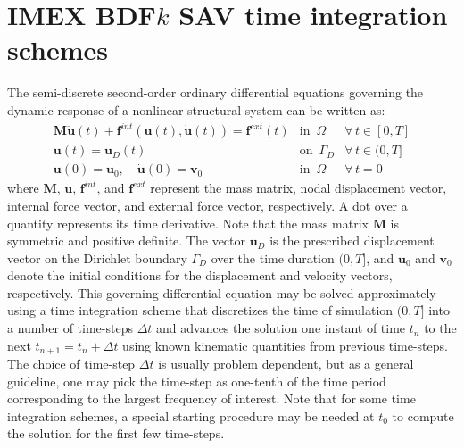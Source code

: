 \documentclass[review]{elsarticle}
\begin{document}
\section{IMEX BDF$k$ SAV time integration schemes}
\label{sec:4th2}
The semi-discrete second-order ordinary differential equations governing the dynamic response of a nonlinear structural system can be written as:
\begin{equation}
    \begin{array}{lll}
        \boldsymbol{M}\ddot{\boldsymbol{u}}(t)+\boldsymbol{f}^{int}(\boldsymbol{u}(t),\dot{\boldsymbol{u}}(t))=\boldsymbol{f}^{ext}(t) & \textrm{in  } \, \Omega & \forall \, t \in [0,T] \\
        \boldsymbol{u}(t) = \boldsymbol{u}_D(t) & \textrm{on  } \, \Gamma_D & \forall \, t \in (0,T] \\
        \boldsymbol{u}(0) = \boldsymbol{u}_0, \quad \dot{\boldsymbol{u}}(0) = \boldsymbol{v}_0 & \textrm{in  } \, \Omega & \forall \, t = 0
    \end{array}
    \label{eqn:4thGDE}
\end{equation}
where $\boldsymbol{M}$, $\boldsymbol{u}$, $\boldsymbol{f}^{int}$, and $\boldsymbol{f}^{ext}$ represent the mass matrix, nodal displacement vector, internal force vector, and external force vector, respectively.
A dot over a quantity represents its time derivative.
Note that the mass matrix $\boldsymbol{M}$ is symmetric and positive definite.
The vector $\boldsymbol{u}_D$ is the prescribed displacement vector on the Dirichlet boundary $\Gamma_D$ over the time duration $(0,T]$, and $\boldsymbol{u}_0$ and $\boldsymbol{v}_0$ denote the initial conditions for the displacement and velocity vectors, respectively.
This governing differential equation may be solved approximately using a time integration scheme that discretizes the time of simulation $(0, T]$ into a number of time-steps $\Delta t$ and advances the solution one instant of time $t_n$ to the next $t_{n+1} = t_n + \Delta t$ using known kinematic quantities from previous time-steps.
The choice of time-step $\Delta t$ is usually problem dependent, but as a general guideline, one may pick the time-step as one-tenth of the time period corresponding to the largest frequency of interest.  
Note that for some time integration schemes, a special starting procedure may be needed at $t_0$ to compute the solution for the first few time-steps. 
\end{document}
